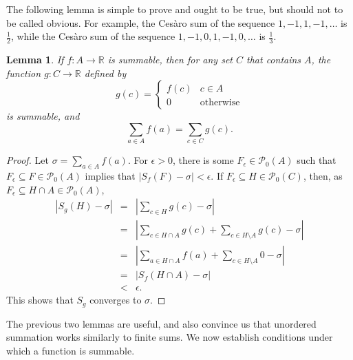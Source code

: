 \documentclass{article}
\newtheorem{lemma}[theorem]{Lemma}
\begin{document}
The following lemma is simple to prove and ought to be true, but should not to be called obvious. 
For example, the Ces\`aro sum of the sequence $1,-1,1,-1,\ldots$ is $\frac{1}{2}$, while the Ces\`aro sum of the sequence
$1,-1,0,1,-1,0,\ldots$ is $\frac{1}{3}$.

\begin{lemma}
If $f:A \to \mathbb{R}$ is summable, then for any set $C$ that contains $A$, the function $g:C \to \mathbb{R}$ defined by
\[
g(c) = \begin{cases}
f(c)&c \in A\\
0&\textrm{otherwise}
\end{cases}
\]
is summable, and
\[
\sum_{a \in A} f(a) = \sum_{c \in C} g(c).
\]
\label{nullsets}
\end{lemma}
\begin{proof}
Let $\sigma=\sum_{a \in A} f(a)$. For $\epsilon>0$, there is some $F_\epsilon \in \mathscr{P}_0(A)$ such that 
$F_\epsilon \subseteq F \in \mathscr{P}_0(A)$ implies that $|S_f(F)-\sigma|<\epsilon$. If $F_\epsilon \subseteq H \in \mathscr{P}_0(C)$,
then, as $F_\epsilon \subseteq H \cap A \in \mathscr{P}_0(A)$,
\begin{eqnarray*}
|S_g(H)-\sigma|&=&\left| \sum_{c \in H} g(c) - \sigma\right|\\
& =& \left| \sum_{c \in H \cap A} g(c) + \sum_{c \in H \setminus A} g(c) - \sigma\right|\\
&=&\left| \sum_{a \in H \cap A} f(a) + \sum_{c \in H \setminus A} 0 - \sigma\right|\\
&=&|S_f(H \cap A) - \sigma|\\
&<&\epsilon.
\end{eqnarray*}
This shows that $S_g$ converges to $\sigma$.
\end{proof}

The previous two lemmas are useful, and also convince us that unordered summation works similarly to finite sums. 
We now establish conditions under which a function is summable.
\end{document}
